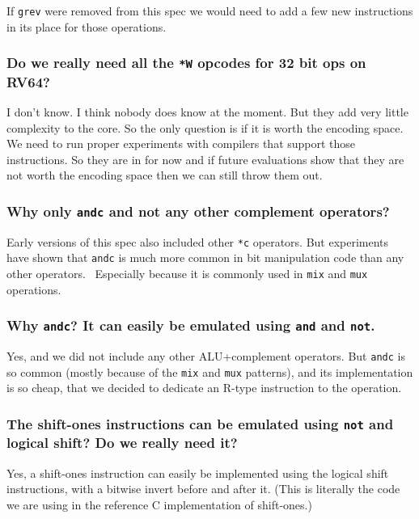 If \texttt{grev} were removed from this spec we would need to add a few
new instructions in its place for those operations.

\subsubsection{Do we really need all the \texttt{*W} opcodes for 32 bit ops on RV64?}

I don't know. I think nobody does know at the moment. But they add very little
complexity to the core. So the only question is if it is worth the encoding
space. We need to run proper experiments with compilers that support those
instructions. So they are in for now and if future evaluations show that they
are not worth the encoding space then we can still throw them out.

\subsubsection{Why only \texttt{andc} and not any other complement operators?}

Early versions of this spec also included other \texttt{*c} operators. But
experiments have shown that \texttt{andc} is much more common in bit
manipulation code than any other operators.~\cite{Wolf17A}
Especially because it is commonly used in \texttt{mix} and \texttt{mux} operations.

\subsubsection{Why \texttt{andc}? It can easily be emulated using \texttt{and} and \texttt{not}.}

Yes, and we did not include any other ALU+complement operators. But \texttt{andc}
is so common (mostly because of the \texttt{mix} and \texttt{mux} patterns), and
its implementation is so cheap, that we decided to dedicate an R-type instruction
to the operation.

\subsubsection{The shift-ones instructions can be emulated using {\tt not} and logical shift? Do we really need it?}

Yes, a shift-ones instruction can easily be implemented using the logical shift
instructions, with a bitwise invert before and after it. (This is literally the
code we are using in the reference C implementation of shift-ones.)

